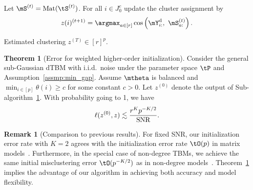 \documentclass[lettersize,onecolumn,journal]{IEEEtran}
\theoremstyle{definition}
\newtheorem{thm}{Theorem}
\theoremstyle{definition}
\newtheorem{rmk}{Remark}
\newcommand{\of}[1]{\left(#1\right)}
\def\fixme#1#2{\textbf{\color{red}[FIXME (#1): #2]}}
\begin{document}
\begin{algorithm}[h!]
\begin{algorithmic}[1]
\State Let $\mS^{(t)} = \text{Mat}(\tS^{(t)})$. For all $i \in J_0^c$ update the cluster assignment by
\begin{equation}
    z(i)^{(t+1)} = \argmax_{a \in [r]} \cos \left( \mY^{\text{d}}_{i:},\ \mS^{(t)}_{a:} \right).
\end{equation}

\EndFor

\OUTPUT Estimated clustering $z^{(T)}  \in [r]^{p}$.

\end{algorithmic}
\end{algorithm}


\begin{thm}[Error for weighted higher-order initialization]\label{thm:initial} Consider the general {\color{blue} sub-Gaussian} dTBM {\color{blue} with i.i.d.\ noise} under the parameter space $\tP$ and Assumption~\ref{assmp:min_gap}. 
Assume $\mtheta$ is balanced and $\min_{i\in[p]}\theta(i) \geq c$ for some constant $c>0$. Let $ z^{(0)}$ denote the output of Sub-algorithm~\hyperref[alg:main]{1}. With probability going to 1, we have
\begin{equation}\label{eq:ini}
   \ell(z^{(0)}, z) \lesssim {r^K p^{-K/2}\over \text{SNR}}. 
\end{equation}
\end{thm}

\begin{rmk}[Comparison to previous results] For fixed SNR, our initialization error rate with $K=2$ agrees with the initialization error rate $\tO(p)$ in matrix models~\citep{gao2018community}. Furthermore, in the special case of non-degree TBMs, we achieve the same initial misclustering error $\tO(p^{-K/2})$ as in non-degree models~\citep{han2020exact}. Theorem~\ref{thm:initial} implies the advantage of our algorithm in achieving both accuracy and model flexibility. 
\end{rmk}
\end{document}

